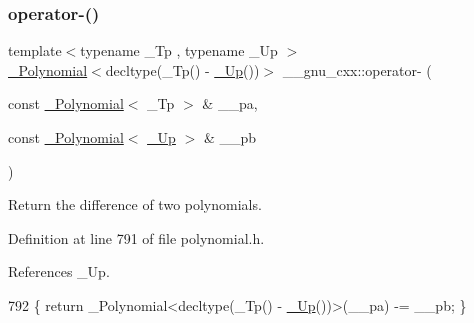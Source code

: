 \subsubsection{\texorpdfstring{operator-\/()}{operator-()}\hspace{0.1cm}{\footnotesize\ttfamily [2/3]}}
{\footnotesize\ttfamily template$<$typename \+\_\+\+Tp , typename \+\_\+\+Up $>$ \\
\hyperlink{class____gnu__cxx_1_1__Polynomial}{\+\_\+\+Polynomial}$<$decltype(\+\_\+\+Tp() -\/ \hyperlink{namespace____gnu__cxx_ab693ea357b6429b331e0bf09f9442385}{\+\_\+\+Up}())$>$ \+\_\+\+\_\+gnu\+\_\+cxx\+::operator-\/ (\begin{DoxyParamCaption}\item[{const \hyperlink{class____gnu__cxx_1_1__Polynomial}{\+\_\+\+Polynomial}$<$ \+\_\+\+Tp $>$ \&}]{\+\_\+\+\_\+pa,  }\item[{const \hyperlink{class____gnu__cxx_1_1__Polynomial}{\+\_\+\+Polynomial}$<$ \hyperlink{namespace____gnu__cxx_ab693ea357b6429b331e0bf09f9442385}{\+\_\+\+Up} $>$ \&}]{\+\_\+\+\_\+pb }\end{DoxyParamCaption})\hspace{0.3cm}{\ttfamily [inline]}}

Return the difference of two polynomials. 

Definition at line 791 of file polynomial.\+h.



References \+\_\+\+Up.


\begin{DoxyCode}
792     \{ \textcolor{keywordflow}{return} \_Polynomial<decltype(\_Tp() - \hyperlink{namespace____gnu__cxx_ab693ea357b6429b331e0bf09f9442385}{\_Up}())>(\_\_pa) -= \_\_pb; \}
\end{DoxyCode}
\mbox{\label{namespace____gnu__cxx_acc72fd3c1efcf09698d30d42c4a1eb1b}} 
